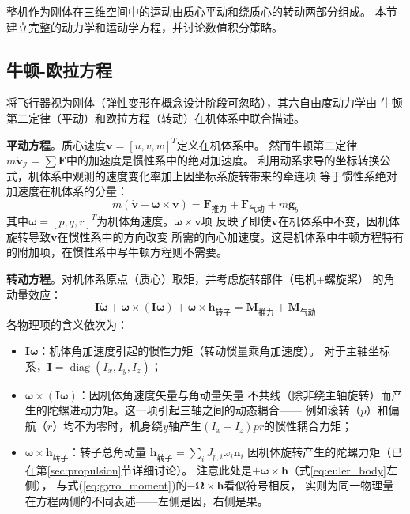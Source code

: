 \documentclass[a4paper,12pt]{ctexart}
\theoremstyle{plain}
\theoremstyle{definition}
\begin{document}
整机作为刚体在三维空间中的运动由质心平动和绕质心的转动两部分组成。
本节建立完整的动力学和运动学方程，并讨论数值积分策略。

\subsection{牛顿-欧拉方程}

将飞行器视为刚体（弹性变形在概念设计阶段可忽略），其六自由度动力学由
牛顿第二定律（平动）和欧拉方程（转动）在机体系中联合描述\cite{stevens2015aircraft}。

\textbf{平动方程}。质心速度$\bm{v} = [u, v, w]^T$定义在机体系中。
然而牛顿第二定律$m\dot{\bm{v}}_{\mathcal{I}} = \sum \bm{F}$中的加速度是惯性系中的绝对加速度。
利用动系求导的坐标转换公式，机体系中观测的速度变化率加上因坐标系旋转带来的牵连项
等于惯性系绝对加速度在机体系的分量：
\begin{equation}
    m \left( \dot{\bm{v}} + \bm{\omega} \times \bm{v} \right)
    = \bm{F}_{\text{推力}} + \bm{F}_{\text{气动}} + m \bm{g}_b
    \label{eq:newton_body}
\end{equation}
其中$\bm{\omega} = [p, q, r]^T$为机体角速度。$\bm{\omega} \times \bm{v}$项
反映了即使$\bm{v}$在机体系中不变，因机体旋转导致$\bm{v}$在惯性系中的方向改变
所需的向心加速度。这是机体系中牛顿方程特有的附加项，在惯性系中写牛顿方程则不需要。

\textbf{转动方程}。对机体系原点（质心）取矩，并考虑旋转部件（电机+螺旋桨）
的角动量效应：
\begin{equation}
    \bm{I} \dot{\bm{\omega}} + \bm{\omega} \times (\bm{I} \bm{\omega})
    + \bm{\omega} \times \bm{h}_{\text{转子}}
    = \bm{M}_{\text{推力}} + \bm{M}_{\text{气动}}
    \label{eq:euler_body}
\end{equation}
各物理项的含义依次为：
\begin{itemize}
    \item $\bm{I} \dot{\bm{\omega}}$：机体角加速度引起的惯性力矩（转动惯量乘角加速度）。
          对于主轴坐标系，$\bm{I} = \operatorname{diag}(I_x, I_y, I_z)$；
    \item $\bm{\omega} \times (\bm{I} \bm{\omega})$：因机体角速度矢量与角动量矢量
          不共线（除非绕主轴旋转）而产生的陀螺进动力矩。这一项引起三轴之间的动态耦合——
          例如滚转（$p$）和偏航（$r$）均不为零时，机身绕$y$轴产生$(I_x-I_z)pr$的惯性耦合力矩；
    \item $\bm{\omega} \times \bm{h}_{\text{转子}}$：转子总角动量
          $\bm{h}_{\text{转子}} = \sum_i J_{p,i} \omega_i \bm{n}_i$
          因机体旋转产生的陀螺力矩（已在第\ref{sec:propulsion}节详细讨论）。
          注意此处是$+\bm{\omega} \times \bm{h}$（式\ref{eq:euler_body}左侧），
          与式(\ref{eq:gyro_moment})的$-\bm{\Omega} \times \bm{h}$看似符号相反，
          实则为同一物理量在方程两侧的不同表述——左侧是因，右侧是果。
\end{itemize}
\end{document}
